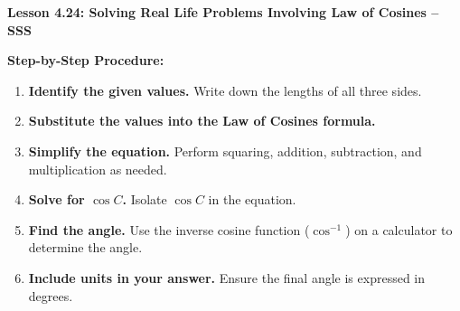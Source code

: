 \begin{center}
\textbf{Lesson 4.24: Solving Real Life Problems Involving Law of Cosines -- SSS}
\end{center}

\vspace*{-1.5ex}

\noindent\textbf{Step-by-Step Procedure:}
\begin{enumerate}
    \item \textbf{Identify the given values.} Write down the lengths of all three sides.
    \item \textbf{Substitute the values into the Law of Cosines formula.}
    \item \textbf{Simplify the equation.} Perform squaring, addition, subtraction, and multiplication as needed.
    \item \textbf{Solve for \(\cos C\).} Isolate \(\cos C\) in the equation.
    \item \textbf{Find the angle.} Use the inverse cosine function (\(\cos^{-1}\)) on a calculator to determine the angle.
    \item \textbf{Include units in your answer.} Ensure the final angle is expressed in degrees.
\end{enumerate}
